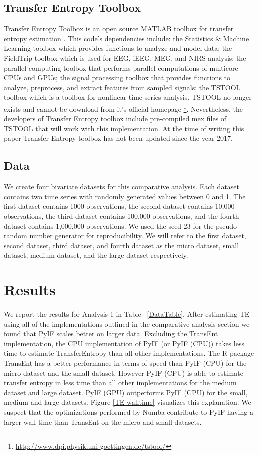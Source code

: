 \documentclass[conference]{IEEEtran}
\begin{document}
\subsection{Transfer Entropy Toolbox}

Transfer Entropy Toolbox  is an open source MATLAB toolbox for transfer entropy estimation \cite{TransferEntropyToolbox}. This code's dependencies include: the Statistics \& Machine Learning toolbox which provides functions to analyze and model data; the FieldTrip toolbox which is used for EEG, iEEG, MEG, and NIRS analysis; the parallel computing toolbox that performs parallel computations of multicore CPUs and GPUs; the signal processing toolbox that provides functions to analyze, preprocess, and extract features from sampled signals; the TSTOOL toolbox which is a toolbox for nonlinear time series analysis. TSTOOL no longer exists and cannot be download from it's official homepage \footnote{\url{http://www.dpi.physik.uni-goettingen.de/tstool/}}. Nevertheless, the developers of Transfer Entropy toolbox include pre-compiled mex files of TSTOOL that will work with this implementation. At the time of writing this paper Transfer Entropy toolbox has not been updated since the year 2017.

\subsection{Data}

We create four bivariate datasets for this comparative analysis. Each dataset contains two time series with randomly generated values between 0 and 1. The first dataset contains 1000 observations, the second dataset contains 10,000 observations, the third dataset contains 100,000 observations, and the fourth dataset contains 1,000,000 observations. We used the seed \(23\) for the pseudo-random number generator for reproducibility. We will refer to the first dataset, second dataset, third dataset, and fourth dataset as the micro dataset, small dataset, medium dataset, and the large dataset respectively.


\section{Results}

We report the results for Analysis 1 in Table ~\ref{DataTable}. After estimating TE using all of the implementations outlined in the comparative analysis section we found that PyIF scales better on larger data. Excluding the TransEnt implementation, the CPU implementation of PyIF (or PyIF (CPU)) takes less time to estimate TransferEntropy than all other implementations. The R package TransEnt has a better performance in terms of speed than PyIF (CPU) for the micro dataset and the small dataset. However PyIF (CPU) is able to estimate transfer entropy in less time than all other implementations for the medium dataset and large dataset. PyIF (GPU) outperforms PyIF (CPU) for the small, medium and large datasets. Figure \ref{TE-walltime} visualizes this explanation. We suspect that the optimizations performed by Numba contribute to PyIF having a larger wall time than TransEnt on the micro and small datasets.
\end{document}
